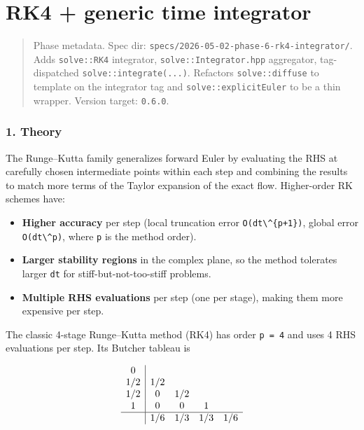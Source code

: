 \chapter{RK4 + generic time integrator}
\label{chap:dev:rk4--generic-time-integrator}

\begin{quote}
Phase metadata. Spec dir:
\passthrough{\lstinline!specs/2026-05-02-phase-6-rk4-integrator/!}. Adds
\passthrough{\lstinline!solve::RK4!} integrator,
\passthrough{\lstinline!solve::Integrator.hpp!} aggregator,
tag-dispatched \passthrough{\lstinline!solve::integrate(...)!}.
Refactors \passthrough{\lstinline!solve::diffuse!} to template on the
integrator tag and \passthrough{\lstinline!solve::explicitEuler!} to be
a thin wrapper. Version target: \passthrough{\lstinline!0.6.0!}.
\end{quote}

\subsection{1. Theory}\label{theory}

The Runge--Kutta family generalizes forward Euler by evaluating the RHS
at carefully chosen intermediate points within each step and combining
the results to match more terms of the Taylor expansion of the exact
flow. Higher-order RK schemes have:

\begin{itemize}
\tightlist
\item
  \textbf{Higher accuracy} per step (local truncation error
  \passthrough{\lstinline!O(dt\^\{p+1\})!}, global error
  \passthrough{\lstinline!O(dt\^p)!}, where \passthrough{\lstinline!p!}
  is the method order).
\item
  \textbf{Larger stability regions} in the complex plane, so the method
  tolerates larger \passthrough{\lstinline!dt!} for
  stiff-but-not-too-stiff problems.
\item
  \textbf{Multiple RHS evaluations} per step (one per stage), making
  them more expensive per step.
\end{itemize}

The classic 4-stage Runge--Kutta method (RK4) has order
\passthrough{\lstinline!p = 4!} and uses 4 RHS evaluations per step. Its
Butcher tableau is

\[
\begin{array}{c|cccc}
0   &       &       &       &       \\
1/2 & 1/2   &       &       &       \\
1/2 & 0     & 1/2   &       &       \\
1   & 0     & 0     & 1     &       \\
\hline
    & 1/6   & 1/3   & 1/3   & 1/6
\end{array}
\]

